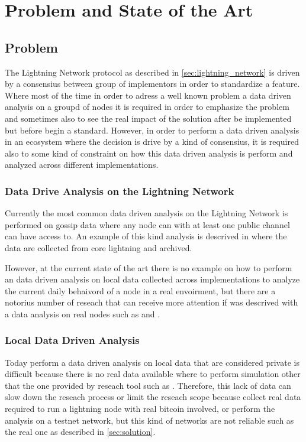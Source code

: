 \chapter{Problem and State of the Art}

\section{Problem}

The Lightning Network protocol as described in \ref{sec:lightning_network} is 
driven by a consensius between group of implementors in order to standardize
a feature. Where most of the time in order to adress a well known problem a data 
driven analysis on a groupd of nodes it is required in order to emphasize the
problem and sometimes also to see the real impact of the solution after be 
implemented but before begin a standard.
However, in order to perform a data driven analysis in an ecosystem where the decision
is drive by a kind of consensius, it is required also to some kind of 
constraint on how this data driven analysis is perform and analyzed across 
different implementations.

\subsection{Data Drive Analysis on the Lightning Network}

Currently the most common data driven analysis on the Lightning Network is performed 
on gossip data where any node can with at least one public channel can 
have access to. An example of this kind analysis is descrived in \cite{lngossip}
where the data are collected from core lightning and archived.

However, at the current state of the art there is no example on how to perform
an data driven analysis on local data collected across implementations to 
analyze the current daily behaivord of a node in a real envoirment, but there
are a notorius number of reseach that can receive more attention if was 
descrived with a data analysis on real nodes such as \cite{DBLP:journals/corr/abs-2103-08576} 
and \cite{cryptoeprint:2022/1454}.


\subsection{Local Data Driven Analysis}

Today perform a data driven analysis on local data that are considered private
is difficult because there is no real data available where to perform simulation
other that the one provided by reseach tool such as \cite{lngossip}.
Therefore, this lack of data can slow down the reseach process or limit the 
reseach scope because collect real data required to run a lightning node 
with real bitcoin involved, or perform the analysis on a 
testnet network, but this kind of networks are not reliable such as 
the real one as described in \ref{sec:solution}. 

